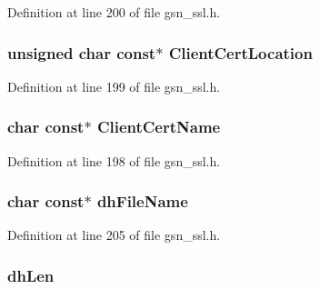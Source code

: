 Definition at line 200 of file gsn\_\-ssl.h.

\hypertarget{a00459_a3363280bf236e6181c6a7ffba2c87d1c}{
\subsubsection[{ClientCertLocation}]{\setlength{\rightskip}{0pt plus 5cm}unsigned char const$\ast$ {\bf ClientCertLocation}}}
\label{a00459_a3363280bf236e6181c6a7ffba2c87d1c}


Definition at line 199 of file gsn\_\-ssl.h.

\hypertarget{a00459_a2a5946e7695789360a828cfff2153714}{
\subsubsection[{ClientCertName}]{\setlength{\rightskip}{0pt plus 5cm}char const$\ast$ {\bf ClientCertName}}}
\label{a00459_a2a5946e7695789360a828cfff2153714}


Definition at line 198 of file gsn\_\-ssl.h.

\hypertarget{a00459_aaff19020db7bd0e1d0bee3b7ee1a9271}{
\subsubsection[{dhFileName}]{\setlength{\rightskip}{0pt plus 5cm}char const$\ast$ {\bf dhFileName}}}
\label{a00459_aaff19020db7bd0e1d0bee3b7ee1a9271}


Definition at line 205 of file gsn\_\-ssl.h.

\hypertarget{a00459_a69fcfbf80e52b3a6a68deed32fd4e026}{
\subsubsection[{dhLen}]{ {\bf dhLen}}}
\label{a00459_a69fcfbf80e52b3a6a68deed32fd4e026}


